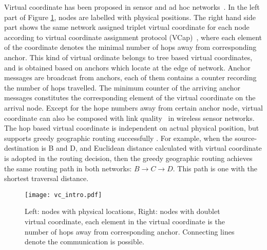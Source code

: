 Virtual coordinate has been proposed in sensor and ad hoc networks~\cite{gpsfree05infocom,Alizai_11_probabilisticAddressing}.
In the left part of Figure \ref{fig:vc_intro}, nodes are labelled with physical positions.
The right hand side part shows the same network assigned triplet virtual coordinate for each node according to virtual coordinate assignment protocol (\gls{VCap})~\cite{gpsfree05infocom}, where each element of the coordinate denotes the minimal number of hops away from corresponding anchor.
This kind of virtual ordinate belongs to tree based virtual coordinates, and is obtained based on anchors which locate at the edge of network.
Anchor messages are broadcast from anchors, each of them contains a counter recording the number of hops travelled.
The minimum counter of the arriving anchor messages constitutes the corresponding element of the virtual coordinate on the arrival node.
Except for the hope numbers away from certain anchor node, virtual coordinate can also be composed with link quality~\cite{Alizai_11_probabilisticAddressing} in wireless sensor networks.
The hop based virtual coordinate is independent on actual physical position, but %
supports greedy geographic routing successfully \cite{gpsfree05infocom, Alizai_11_probabilisticAddressing}.
For example, when the source-destination is B and D, and Euclidean distance calculated with virtual coordinate is adopted in the routing decision, then the greedy geographic routing achieves the same routing path in both networks: $B\rightarrow C\rightarrow D$. This path is one with the shortest traversal distance.


\begin{figure}
\centering
\texttt{[image: vc\_intro.pdf]}
\caption{Left: nodes with physical locations, Right: nodes with doublet virtual coordinate, each element in the virtual coordinate is the number of hops away from corresponding anchor. Connecting lines denote the communication is possible.}
\label{fig:vc_intro}
\end{figure}


